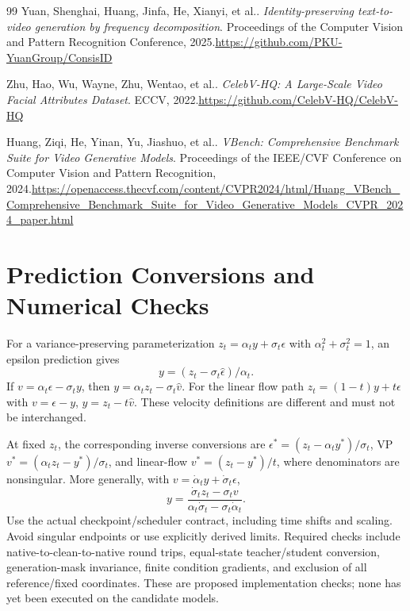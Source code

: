 \documentclass{article}
\begin{document}
\begin{thebibliography}{99}
Yuan, Shenghai, Huang, Jinfa, He, Xianyi, et al.. \emph{Identity-preserving text-to-video generation by frequency decomposition}. Proceedings of the Computer Vision and Pattern Recognition Conference, 2025.\newline\url{https://github.com/PKU-YuanGroup/ConsisID}

Zhu, Hao, Wu, Wayne, Zhu, Wentao, et al.. \emph{CelebV-HQ: A Large-Scale Video Facial Attributes Dataset}. ECCV, 2022.\newline\url{https://github.com/CelebV-HQ/CelebV-HQ}

Huang, Ziqi, He, Yinan, Yu, Jiashuo, et al.. \emph{VBench: Comprehensive Benchmark Suite for Video Generative Models}. Proceedings of the IEEE/CVF Conference on Computer Vision and Pattern Recognition, 2024.\newline\url{https://openaccess.thecvf.com/content/CVPR2024/html/Huang_VBench_Comprehensive_Benchmark_Suite_for_Video_Generative_Models_CVPR_2024_paper.html}
\end{thebibliography}

\appendix
\section{Prediction Conversions and Numerical Checks}
For a variance-preserving parameterization $z_t=\alpha_t y+\sigma_t\epsilon$ with $\alpha_t^2+\sigma_t^2=1$, an epsilon prediction gives
\begin{equation}
 y=(z_t-\sigma_t\hat\epsilon)/\alpha_t.
\end{equation}
If $v=\alpha_t\epsilon-\sigma_t y$, then $y=\alpha_t z_t-\sigma_t\hat v$. For the linear flow path $z_t=(1-t)y+t\epsilon$ with $v=\epsilon-y$, $y=z_t-t\hat v$. These velocity definitions are different and must not be interchanged.

At fixed $z_t$, the corresponding inverse conversions are $\epsilon^*=(z_t-\alpha_t y^*)/\sigma_t$, VP $v^*=(\alpha_t z_t-y^*)/\sigma_t$, and linear-flow $v^*=(z_t-y^*)/t$, where denominators are nonsingular. More generally, with $v=\dot\alpha_t y+\dot\sigma_t\epsilon$,
\begin{equation}
 y=\frac{\dot\sigma_t z_t-\sigma_t v}
 {\alpha_t\dot\sigma_t-\sigma_t\dot\alpha_t}.
\end{equation}
Use the actual checkpoint/scheduler contract, including time shifts and scaling. Avoid singular endpoints or use explicitly derived limits. Required checks include native-to-clean-to-native round trips, equal-state teacher/student conversion, generation-mask invariance, finite condition gradients, and exclusion of all reference/fixed coordinates. These are proposed implementation checks; none has yet been executed on the candidate models.
\end{document}
